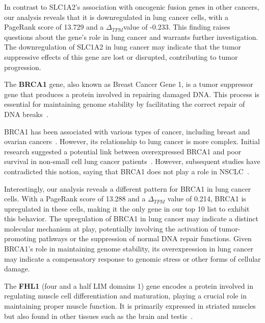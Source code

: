 In contrast to SLC1A2's association with oncogenic fusion genes in other cancers,
our analysis reveals that it is downregulated in lung cancer cells,
with a PageRank score of 13.729 and a $\Delta_{TPM}$value of -0.233.
This finding raises questions about the gene's role in lung cancer and warrants further investigation.
The downregulation of SLC1A2 in lung cancer may indicate that the tumor suppressive effects of this gene are lost or disrupted,
contributing to tumor progression.
\newline

The \textbf{BRCA1} gene, also known as Breast Cancer Gene 1, is a tumor suppressor gene
that produces a protein involved in repairing damaged DNA\@.
This process is essential for maintaining genome stability by facilitating the correct repair of DNA breaks~\cite{NCI2020BRCA1}.

BRCA1 has been associated with various types of cancer, including breast and ovarian cancers~\cite{Lee2020BRCA1}.
However, its relationship to lung cancer is more complex.
Initial research suggested a potential link between overexpressed BRCA1 and
poor survival in non-small cell lung cancer patients~\cite{Rosell2007BRCA1}.
However, subsequent studies have contradicted this notion,
saying that BRCA1 does not play a role in NSCLC~\cite{Gachechiladze2012BRCA1,Lee2020BRCA1}.

Interestingly, our analysis reveals a different pattern for BRCA1 in lung cancer cells.
With a PageRank score of 13.288 and a $\Delta_{TPM}$ value of 0.214,
BRCA1 is upregulated in these cells, making it the only gene in our top 10 list to exhibit this behavior.
The upregulation of BRCA1 in lung cancer may indicate a distinct molecular mechanism at play,
potentially involving the activation of tumor-promoting pathways or the suppression of normal DNA repair functions.
Given BRCA1's role in maintaining genome stability,
its overexpression in lung cancer may indicate a compensatory response to genomic stress or other forms of cellular damage.
\newline

The \textbf{FHL1} (four and a half LIM domains 1) gene encodes a protein
involved in regulating muscle cell differentiation and maturation,
playing a crucial role in maintaining proper muscle function.
It is primarily expressed in striated muscles but also found in other tissues such as the brain and testis~\cite{Storey2020FHL1}.

